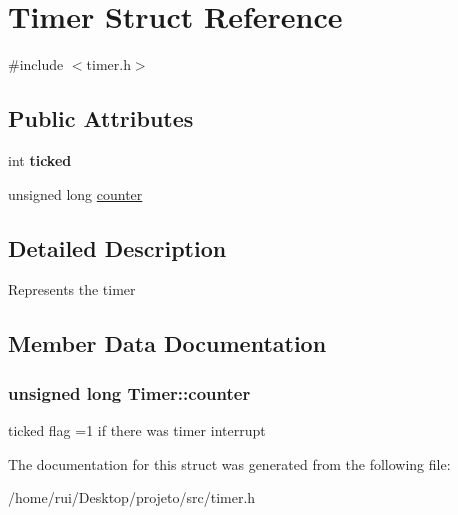 \hypertarget{structTimer}{}\section{Timer Struct Reference}
\label{structTimer}


{\ttfamily \#include $<$timer.\+h$>$}

\subsection*{Public Attributes}
\begin{DoxyCompactItemize}
\item 
int {\bfseries ticked}\hypertarget{structTimer_a6793f2bc8d6af06446591e8a8bc9e65c}{}\label{structTimer_a6793f2bc8d6af06446591e8a8bc9e65c}

\item 
unsigned long \hyperlink{structTimer_a3b4321cf766b62d7cdf3fad0d5e25a91}{counter}
\end{DoxyCompactItemize}


\subsection{Detailed Description}
Represents the timer 

\subsection{Member Data Documentation}
\subsubsection[{\texorpdfstring{counter}{counter}}]{\setlength{\rightskip}{0pt plus 5cm}unsigned long Timer\+::counter}\hypertarget{structTimer_a3b4321cf766b62d7cdf3fad0d5e25a91}{}\label{structTimer_a3b4321cf766b62d7cdf3fad0d5e25a91}
ticked flag =1 if there was timer interrupt 

The documentation for this struct was generated from the following file\+:\begin{DoxyCompactItemize}
\item 
/home/rui/\+Desktop/projeto/src/timer.\+h\end{DoxyCompactItemize}
